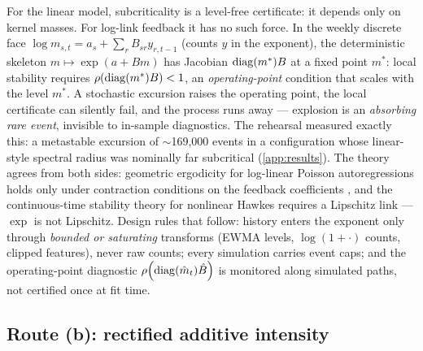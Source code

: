 \begin{warning}\label{warn:ch05:mechB}
For the linear model, subcriticality is a level-free certificate: it
depends only on kernel masses. For log-link feedback it has no such
force. In the weekly discrete face $\log m_{s,t} = a_s + \sum_r B_{sr}
y_{r,t-1}$ (counts $y$ in the exponent), the deterministic skeleton $m
\mapsto \exp(a + Bm)$ has Jacobian $\operatorname{diag}(m^*)B$ at a fixed point $m^*$:
local stability requires $\rho\!\left(\operatorname{diag}(m^*)B\right) < 1$, an
\emph{operating-point} condition that scales with the level $m^*$. A
stochastic excursion raises the operating point, the local certificate
can silently fail, and the process runs away --- explosion is an
\emph{absorbing rare event}, invisible to in-sample diagnostics. The
rehearsal measured exactly this: a metastable excursion of
$\sim$169{,}000 events in a configuration whose linear-style spectral
radius was nominally far subcritical (\cref{app:results}). The theory
agrees from both sides: geometric ergodicity for log-linear Poisson
autoregressions holds only under contraction conditions on the feedback
coefficients \citep{fokianos2011}, and the continuous-time stability
theory for nonlinear Hawkes requires a Lipschitz link
\citep{bremaud1996} --- $\exp$ is not Lipschitz. Design rules that
follow: history enters the exponent only through \emph{bounded or
saturating} transforms (EWMA levels, $\log(1+\cdot)$ counts, clipped
features), never raw counts; every simulation carries event caps; and the
operating-point diagnostic $\rho\!\left(\operatorname{diag}(\hat m_t)\hat B\right)$ is monitored
along simulated paths, not certified once at fit time.
\end{warning}

\subsection*{Route (b): rectified additive intensity}

